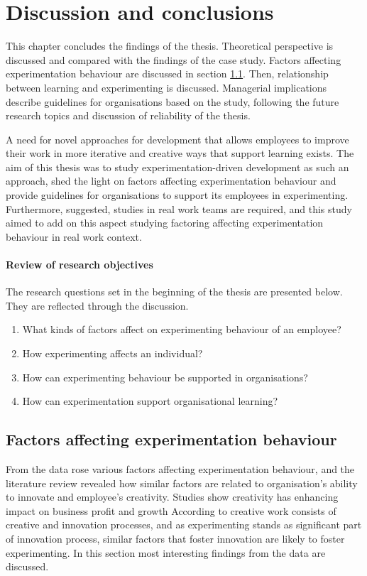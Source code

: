 \chapter{Discussion and conclusions} \label{conclusions}
This chapter concludes the findings of the thesis. Theoretical perspective is discussed and compared with the findings of the case study.  Factors affecting experimentation behaviour are discussed in section \ref{fae}. Then, relationship between learning and experimenting is discussed. Managerial implications describe guidelines for organisations based on the study, following the future research topics and discussion of reliability of the thesis. 

A need for novel approaches for development that allows employees to improve their work in more iterative and creative ways that support learning exists. The aim of this thesis was to study experimentation-driven development as such an approach, shed the light on factors affecting experimentation behaviour and provide guidelines for organisations to support its employees in experimenting. Furthermore, \citet{edmondson1999psychological} suggested, studies in real work teams are required, and this study aimed to add on this aspect studying factoring affecting experimentation behaviour in real work context. 

\subsubsection*{Review of research objectives}
The research questions set in the beginning of the thesis are presented below. They are reflected through the discussion. 

\begin{enumerate}
 \item What kinds of factors affect on experimenting behaviour of an employee? 
 \item How experimenting affects an individual? 
  \item How can experimenting behaviour be supported in organisations?
  \item How can experimentation support organisational learning?
\end{enumerate}

\section{Factors affecting experimentation behaviour} \label{fae}
From the data rose various factors affecting experimentation behaviour, and the literature review revealed how similar factors are related to organisation's ability to innovate and employee's creativity. Studies show creativity has enhancing impact on business profit and growth \citep{nystrom1990organizational} According to \citet{vincent2002divergent} creative work consists of creative and innovation processes, and as experimenting stands as significant part of innovation process, similar factors that foster innovation are likely to foster experimenting. In this section most interesting findings from the data are discussed. 

